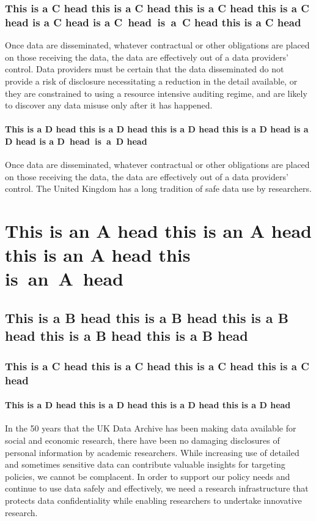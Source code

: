 \documentclass{CUP-JNL-DAP}%
\begin{document}
\subsubsection{This is a C head this is a C head this is a C head this is a C head is a C head is a C~head~is~a~C head this is a C head}

Once data are disseminated, whatever contractual or other obligations are placed on those receiving the
data, the data are effectively out of a data providers' control. Data providers must be certain that the data
disseminated do not provide a risk of disclosure necessitating a reduction in the detail available, or they are
constrained to using a resource intensive auditing regime, and are likely to discover any data misuse only
after it has happened.

\paragraph{This is a D head this is a D head this is a D head this is a D head is a D head is a D~head~is~a~D head}

Once data are disseminated, whatever contractual or other obligations are placed on those receiving the
data, the data are effectively out of a data providers' control.
The United Kingdom has a long tradition of safe data use by researchers.

\section[This is an A Head]{This is an A head this is an A head this is an A head this is~an~A~head}
\subsection{This is a B head this is a B head this is a B head this is a B head this is a B head}
\subsubsection{This is a C head this is a C head this is a C head this is a C head}
\paragraph{This is a D head this is a D head this is a D head this is a D head}
In the 50 years that the UK
Data Archive has been making data available for social and economic research, there have been no
damaging disclosures of personal information by academic researchers. While increasing use of detailed and sometimes sensitive
data can contribute valuable insights for targeting policies, we cannot be
complacent. In order to support our policy needs and continue to use data safely and effectively, we
need a research infrastructure that protects data confidentiality while enabling researchers to undertake
innovative research.
\end{document}
